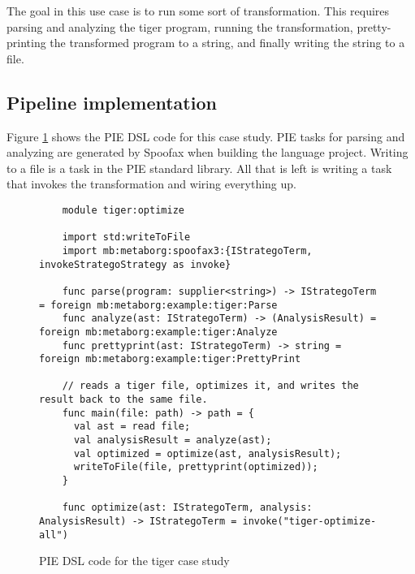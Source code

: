 The goal in this use case is to run some sort of transformation.
This requires parsing and analyzing the tiger program, running the transformation, pretty-printing the transformed program to a string, and finally writing the string to a file.

\subsection{Pipeline implementation}
\label{subsec:evaluation__tiger__implementation}

Figure \ref{lst:case_study_tiger_pie} shows the \ac{PIE} \ac{DSL} code for this case study.
\Ac{PIE} tasks for parsing and analyzing are generated by Spoofax when building the language project.
Writing to a file is a task in the \ac{PIE} standard library.
All that is left is writing a task that invokes the transformation and wiring everything up.

\begin{figure}
  \caption{\Ac{PIE} \ac{DSL} code for the tiger case study}
  \label{lst:case_study_tiger_pie}
  \begin{lstlisting}
    module tiger:optimize

    import std:writeToFile
    import mb:metaborg:spoofax3:{IStrategoTerm, invokeStrategoStrategy as invoke}

    func parse(program: supplier<string>) -> IStrategoTerm = foreign mb:metaborg:example:tiger:Parse
    func analyze(ast: IStrategoTerm) -> (AnalysisResult) = foreign mb:metaborg:example:tiger:Analyze
    func prettyprint(ast: IStrategoTerm) -> string = foreign mb:metaborg:example:tiger:PrettyPrint

    // reads a tiger file, optimizes it, and writes the result back to the same file.
    func main(file: path) -> path = {
      val ast = read file;
      val analysisResult = analyze(ast);
      val optimized = optimize(ast, analysisResult);
      writeToFile(file, prettyprint(optimized));
    }

    func optimize(ast: IStrategoTerm, analysis: AnalysisResult) -> IStrategoTerm = invoke("tiger-optimize-all")
  \end{lstlisting}
\end{figure}


